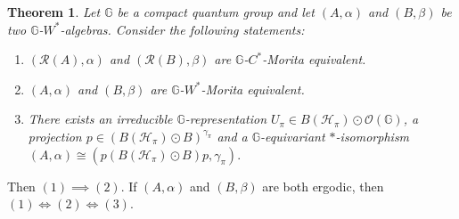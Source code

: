 \documentclass[reqno]{amsart}
\numberwithin{equation}{section}
\newtheorem{Theorem}{Theorem}[section]
\newcommand{\G}{\mathbb{G}}
\begin{document}
\begin{Theorem}\label{ergodic} Let $\G$ be a compact quantum group and let $(A, \alpha)$ and $(B, \beta)$ be two $\G$-$W^*$-algebras. Consider the following statements:
    \begin{enumerate}\setlength\itemsep{-0.5em}            \item $(\mathcal{R}(A), \alpha)$ and $(\mathcal{R}(B), \beta)$ are $\G$-$C^*$-Morita equivalent.
        \item $(A, \alpha)$ and $(B, \beta)$ are $\G$-$W^*$-Morita equivalent.
        \item There exists an irreducible $\G$-representation $U_\pi\in B(\mathcal{H}_\pi)\odot \mathcal{O}(\G)$, a projection $p \in (B(\mathcal{H}_\pi)\odot B)^{\gamma_\pi}$ and a $\G$-equivariant $*$-isomorphism $(A, \alpha)\cong (p(B(\mathcal{H}_\pi)\odot B)p, \gamma_\pi).$
    \end{enumerate}
\end{Theorem}
Then $(1)\implies (2)$. If $(A, \alpha)$ and $(B, \beta)$ are both ergodic, then $(1)\iff (2) \iff (3)$.
\end{document}
